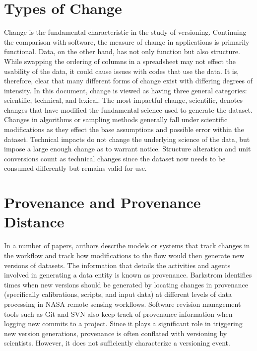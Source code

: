 \section{Types of Change}

Change is the fundamental characteristic in the study of versioning.  Continuing the comparison with software, the measure of change in applications is primarily functional.  Data, on the other hand, has not only function but also structure.  While swapping the ordering of columns in a spreadsheet may not effect the usability of the data, it could cause issues with codes that use the data.  It is, therefore, clear that many different forms of change exist with differing degrees of intensity.  In this document, change is viewed as having three general categories: scientific, technical, and lexical.  The most impactful change, scientific, denotes changes that have modified the fundamental science used to generate the dataset.  Changes in algorithms or sampling methods generally fall under scientific modifications as they effect the base assumptions and possible error within the dataset.  Technical impacts do not change the underlying science of the data, but impose a large enough change as to warrant notice.  Structure alteration and unit conversions count as technical changes since the dataset now needs to be consumed differently but remains valid for use.  

\section{Provenance and Provenance Distance}

In a number of papers, authors describe models or systems that track changes in the workflow and track how modifications to the flow would then generate new versions of datasets.  The information that details the activities and agents involved in generating a data entity is known as provenance.  Barkstrom identifies times when new versions should be generated by locating changes in provenance (specifically calibrations, scripts, and input data) at different levels of data processing in NASA remote sensing workflows.  Software revision management tools such as Git and SVN also keep track of provenance information when logging new commits to a project.  Since it plays a significant role in triggering new version generations, provenance is often conflated with versioning by scientists.  However, it does not sufficiently characterize a versioning event.

